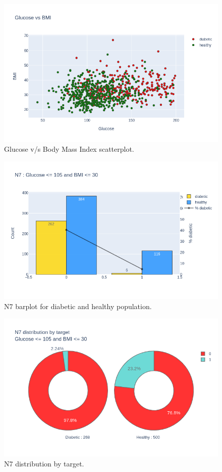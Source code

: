 \documentclass[12pt]{article}
\begin{document}
\begin{figure}[ht]
\centering
\includegraphics[width=1\textwidth]{newplot(28).png}
\caption{\label{fig:38} Glucose v/s Body Mass Index scatterplot.}
\end{figure}

\begin{figure}[ht]
\centering
\includegraphics[width=1\textwidth]{newplot(29).png}
\caption{\label{fig:39} N7 barplot for diabetic and healthy population.}
\end{figure}

\begin{figure}[ht]
\centering
\includegraphics[width=1\textwidth]{newplot(30).png}
\caption{\label{fig:40} N7 distribution by target.}
\end{figure}
\end{document}
